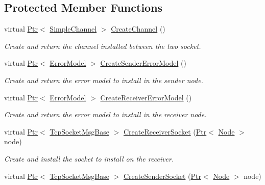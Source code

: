 \subsection*{Protected Member Functions}
\begin{DoxyCompactItemize}
\item 
virtual \hyperlink{classns3_1_1Ptr}{Ptr}$<$ \hyperlink{classns3_1_1SimpleChannel}{Simple\+Channel} $>$ \hyperlink{classns3_1_1TcpGeneralTest_a809e0bad8c6722d3a0fcd6747a231e35}{Create\+Channel} ()
\begin{DoxyCompactList}\small\item\em Create and return the channel installed between the two socket. \end{DoxyCompactList}\item 
virtual \hyperlink{classns3_1_1Ptr}{Ptr}$<$ \hyperlink{classns3_1_1ErrorModel}{Error\+Model} $>$ \hyperlink{classns3_1_1TcpGeneralTest_aecdfb4a8465389c2ac5887597ba6014a}{Create\+Sender\+Error\+Model} ()
\begin{DoxyCompactList}\small\item\em Create and return the error model to install in the sender node. \end{DoxyCompactList}\item 
virtual \hyperlink{classns3_1_1Ptr}{Ptr}$<$ \hyperlink{classns3_1_1ErrorModel}{Error\+Model} $>$ \hyperlink{classns3_1_1TcpGeneralTest_a256082023d4a67738c946d66c175a6d9}{Create\+Receiver\+Error\+Model} ()
\begin{DoxyCompactList}\small\item\em Create and return the error model to install in the receiver node. \end{DoxyCompactList}\item 
virtual \hyperlink{classns3_1_1Ptr}{Ptr}$<$ \hyperlink{classns3_1_1TcpSocketMsgBase}{Tcp\+Socket\+Msg\+Base} $>$ \hyperlink{classns3_1_1TcpGeneralTest_a5f2bfe5673d80704ec6608badf7c1c6e}{Create\+Receiver\+Socket} (\hyperlink{classns3_1_1Ptr}{Ptr}$<$ \hyperlink{classns3_1_1Node}{Node} $>$ node)
\begin{DoxyCompactList}\small\item\em Create and install the socket to install on the receiver. \end{DoxyCompactList}\item 
virtual \hyperlink{classns3_1_1Ptr}{Ptr}$<$ \hyperlink{classns3_1_1TcpSocketMsgBase}{Tcp\+Socket\+Msg\+Base} $>$ \hyperlink{classns3_1_1TcpGeneralTest_a0476c37d8a08b42d42f6ea2634eece70}{Create\+Sender\+Socket} (\hyperlink{classns3_1_1Ptr}{Ptr}$<$ \hyperlink{classns3_1_1Node}{Node} $>$ node)

\end{DoxyCompactItemize}
